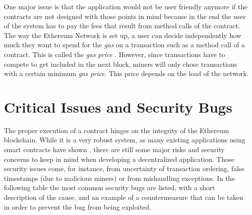 One major issue is that the application would not be user friendly anymore if the contracts are not designed with those points in mind because in the end the user of the system has to pay the fees that result from method calls of the contract. The way the Ethereum Network is set up, a user can decide independently how much they want to spend for the \emph{gas} on a transaction such as a method call of a contract. This is called the \emph{gas price} \cite[p.~7]{Buterin2013}. However, since transactions have to compete to get included in the next block, miners will only chose transactions with a certain minimum \emph{gas price}. This price depends on the load of the network.

\section*{Critical Issues and Security Bugs}
The proper execution of a contract hinges on the integrity of the Ethereum blockchain. While it is a very robust system, as many existing applications using smart contracts have shown \cite{chohan2017leisures}, there are still some major risks and security concerns to keep in mind when developing a decentralized application. Those security issues come, for instance, from uncertainty of transaction ordering, false timestamps (due to malicious miners) or from mishandling exceptions. In the following table the most common security bugs are listed, with a short description of the cause, and an example of a countermeasure that can be taken in order to prevent the bug from being exploited.
